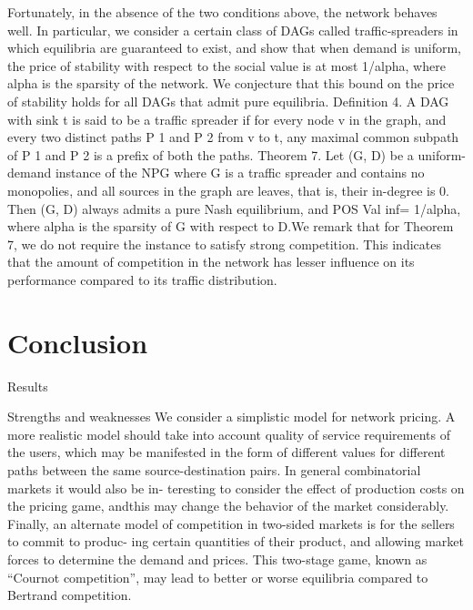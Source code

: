 \documentclass{beamer}
\begin{document}
\begin{frame}
Fortunately, in the absence of the two conditions above, the network behaves
well. In particular, we consider a certain class of DAGs called traffic-spreaders
in which equilibria are guaranteed to exist, and show that when demand is
uniform, the price of stability with respect to the social value is at most 1/alpha,
where alpha is the sparsity of the network. We conjecture that this bound on the
price of stability holds for all DAGs that admit pure equilibria.
Definition 4. A DAG with sink t is said to be a traffic spreader if for every
node v in the graph, and every two distinct paths P 1 and P 2 from v to t, any
maximal common subpath of P 1 and P 2 is a prefix of both the paths.
Theorem 7. Let (G, D) be a uniform-demand instance of the NPG where G
is a traffic spreader and contains no monopolies, and all sources in the graph
are leaves, that is, their in-degree is 0. Then (G, D) always admits a pure Nash
equilibrium, and POS Val inf= 1/alpha, where alpha is the sparsity of G with respect to D.We remark that for Theorem 7, we do not require the instance to satisfy strong
competition. This indicates that the amount of competition in the network has
lesser influence on its performance compared to its traffic distribution.
\end{frame}






\section{Conclusion}

\begin{frame}{Results}
\end{frame}

\begin{frame}{Strengths and weaknesses}
We consider a simplistic model for network pricing. A more realistic model should
take into account quality of service requirements of the users, which may be
manifested in the form of different values for different paths between the same
source-destination pairs. In general combinatorial markets it would also be in-
teresting to consider the effect of production costs on the pricing game, andthis may change the behavior of the market considerably. Finally, an alternate
model of competition in two-sided markets is for the sellers to commit to produc-
ing certain quantities of their product, and allowing market forces to determine
the demand and prices. This two-stage game, known as “Cournot competition”,
may lead to better or worse equilibria compared to Bertrand competition.
\end{frame}
\end{document}
